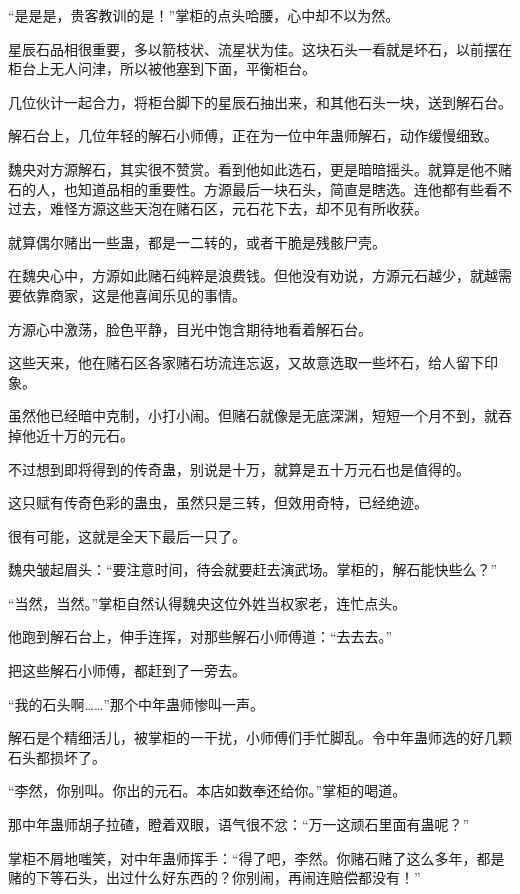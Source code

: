 \begin{this_body}
“是是是，贵客教训的是！”掌柜的点头哈腰，心中却不以为然。

星辰石品相很重要，多以箭枝状、流星状为佳。这块石头一看就是坏石，以前摆在柜台上无人问津，所以被他塞到下面，平衡柜台。

几位伙计一起合力，将柜台脚下的星辰石抽出来，和其他石头一块，送到解石台。

解石台上，几位年轻的解石小师傅，正在为一位中年蛊师解石，动作缓慢细致。

魏央对方源解石，其实很不赞赏。看到他如此选石，更是暗暗摇头。就算是他不赌石的人，也知道品相的重要性。方源最后一块石头，简直是瞎选。连他都有些看不过去，难怪方源这些天泡在赌石区，元石花下去，却不见有所收获。

就算偶尔赌出一些蛊，都是一二转的，或者干脆是残骸尸壳。

在魏央心中，方源如此赌石纯粹是浪费钱。但他没有劝说，方源元石越少，就越需要依靠商家，这是他喜闻乐见的事情。

方源心中激荡，脸色平静，目光中饱含期待地看着解石台。

这些天来，他在赌石区各家赌石坊流连忘返，又故意选取一些坏石，给人留下印象。

虽然他已经暗中克制，小打小闹。但赌石就像是无底深渊，短短一个月不到，就吞掉他近十万的元石。

不过想到即将得到的传奇蛊，别说是十万，就算是五十万元石也是值得的。

这只赋有传奇色彩的蛊虫，虽然只是三转，但效用奇特，已经绝迹。

很有可能，这就是全天下最后一只了。

魏央皱起眉头：“要注意时间，待会就要赶去演武场。掌柜的，解石能快些么？”

“当然，当然。”掌柜自然认得魏央这位外姓当权家老，连忙点头。

他跑到解石台上，伸手连挥，对那些解石小师傅道：“去去去。”

把这些解石小师傅，都赶到了一旁去。

“我的石头啊……”那个中年蛊师惨叫一声。

解石是个精细活儿，被掌柜的一干扰，小师傅们手忙脚乱。令中年蛊师选的好几颗石头都损坏了。

“李然，你别叫。你出的元石。本店如数奉还给你。”掌柜的喝道。

那中年蛊师胡子拉碴，瞪着双眼，语气很不忿：“万一这顽石里面有蛊呢？”

掌柜不屑地嗤笑，对中年蛊师挥手：“得了吧，李然。你赌石赌了这么多年，都是赌的下等石头，出过什么好东西的？你别闹，再闹连赔偿都没有！”


\end{this_body}
